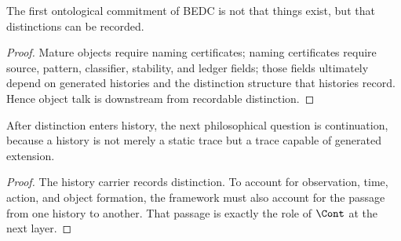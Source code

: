 \begin{corollary}
\label{cor:philosophy-ontology-begins-recordable-distinction}
The first ontological commitment of BEDC is not that things exist, but
that distinctions can be recorded.
\end{corollary}
\begin{proof}
Mature objects require naming certificates; naming certificates require
source, pattern, classifier, stability, and ledger fields; those fields
ultimately depend on generated histories and the distinction structure
that histories record. Hence object talk is downstream from recordable
distinction.
\end{proof}

\begin{corollary}
\label{cor:philosophy-passage-to-continuation}
After distinction enters history, the next philosophical question is
continuation, because a history is not merely a static trace but a
trace capable of generated extension.
\end{corollary}
\begin{proof}
The history carrier records distinction. To account for observation,
time, action, and object formation, the framework must also account for
the passage from one history to another. That passage is exactly the
role of \(\Cont\) at the next layer.
\end{proof}
